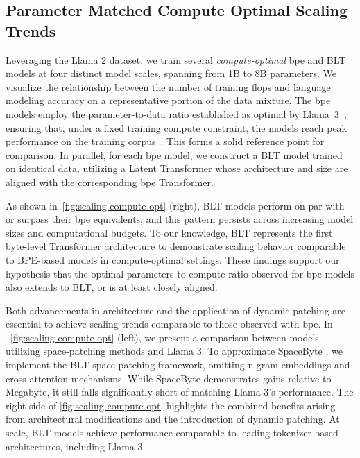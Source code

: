 \subsection{Parameter Matched Compute Optimal Scaling Trends}
\label{section:parameter-matched-scaling}
Leveraging the Llama 2 dataset, we train several \textit{compute-optimal} bpe and {\textsc BLT} models at four distinct model scales, spanning from 1B to 8B parameters. We visualize the relationship between the number of training flops and language modeling accuracy on a representative portion of the data mixture. The bpe models employ the parameter-to-data ratio established as optimal by Llama~3~\citep{dubey2024llama}, ensuring that, under a fixed training compute constraint, the models reach peak performance on the training corpus~\citep{hoffmann2022training}. This forms a solid reference point for comparison. In parallel, for each bpe model, we construct a {\textsc BLT} model trained on identical data, utilizing a Latent Transformer whose architecture and size are aligned with the corresponding bpe Transformer.

As shown in~\autoref{fig:scaling-compute-opt} (right), {\textsc BLT} models perform on par with or surpass their bpe equivalents, and this pattern persists across increasing model sizes and computational budgets. To our knowledge, {\textsc BLT} represents the first byte-level Transformer architecture to demonstrate scaling behavior comparable to BPE-based models in compute-optimal settings. These findings support our hypothesis that the optimal parameters-to-compute ratio observed for bpe models also extends to {\textsc BLT}, or is at least closely aligned.

Both advancements in architecture and the application of dynamic patching are essential to achieve scaling trends comparable to those observed with bpe. In ~\autoref{fig:scaling-compute-opt} (left), we present a comparison between models utilizing space-patching methods and Llama 3. To approximate SpaceByte \citep{slagle2024spacebyte}, we implement the {\textsc BLT} space-patching framework, omitting n-gram embeddings and cross-attention mechanisms. While SpaceByte demonstrates gains relative to Megabyte, it still falls significantly short of matching Llama 3’s performance. The right side of \autoref{fig:scaling-compute-opt} highlights the combined benefits arising from architectural modifications and the introduction of dynamic patching. At scale, {\textsc BLT} models achieve performance comparable to leading tokenizer-based architectures, including Llama 3.

